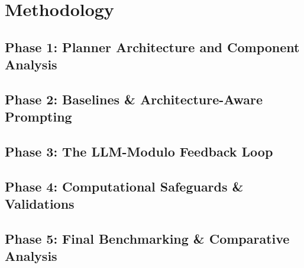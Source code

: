 \chapter{Methodology}\label{sec:methodology}

\section{Phase 1: Planner Architecture and Component Analysis}
\label{sec:methodology:phase1}


\section{Phase 2: Baselines \& Architecture-Aware Prompting}
\label{sec:methodology:phase2}


\section{Phase 3: The LLM-Modulo Feedback Loop}
\label{sec:methodology:phase3}


\section{Phase 4: Computational Safeguards \& Validations}
\label{sec:methodology:phase4}


\section{Phase 5: Final Benchmarking \& Comparative Analysis}
\label{sec:methodology:phase5}

